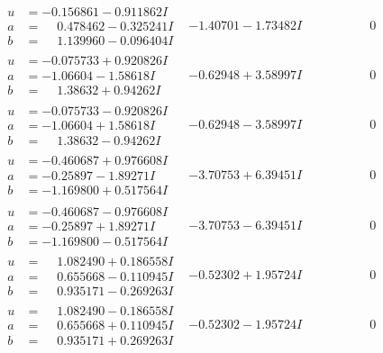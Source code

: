 \documentclass[1p]{elsarticle_modified}
\theoremstyle{definition}
\begin{document}
$$\begin{array}{c|c|c}
\begin{aligned}
u &= -0.156861 - 0.911862 I \\
a &= \phantom{-}0.478462 - 0.325241 I \\
b &= \phantom{-}1.139960 - 0.096404 I\end{aligned}
 & -1.40701 - 1.73482 I & \phantom{-0.000000 } 0 \\ \hline\begin{aligned}
u &= -0.075733 + 0.920826 I \\
a &= -1.06604 - 1.58618 I \\
b &= \phantom{-}1.38632 + 0.94262 I\end{aligned}
 & -0.62948 + 3.58997 I & \phantom{-0.000000 } 0 \\ \hline\begin{aligned}
u &= -0.075733 - 0.920826 I \\
a &= -1.06604 + 1.58618 I \\
b &= \phantom{-}1.38632 - 0.94262 I\end{aligned}
 & -0.62948 - 3.58997 I & \phantom{-0.000000 } 0 \\ \hline\begin{aligned}
u &= -0.460687 + 0.976608 I \\
a &= -0.25897 - 1.89271 I \\
b &= -1.169800 + 0.517564 I\end{aligned}
 & -3.70753 + 6.39451 I & \phantom{-0.000000 } 0 \\ \hline\begin{aligned}
u &= -0.460687 - 0.976608 I \\
a &= -0.25897 + 1.89271 I \\
b &= -1.169800 - 0.517564 I\end{aligned}
 & -3.70753 - 6.39451 I & \phantom{-0.000000 } 0 \\ \hline\begin{aligned}
u &= \phantom{-}1.082490 + 0.186558 I \\
a &= \phantom{-}0.655668 - 0.110945 I \\
b &= \phantom{-}0.935171 - 0.269263 I\end{aligned}
 & -0.52302 + 1.95724 I & \phantom{-0.000000 } 0 \\ \hline\begin{aligned}
u &= \phantom{-}1.082490 - 0.186558 I \\
a &= \phantom{-}0.655668 + 0.110945 I \\
b &= \phantom{-}0.935171 + 0.269263 I\end{aligned}
 & -0.52302 - 1.95724 I & \phantom{-0.000000 } 0 \\ \hline\begin{aligned}

\end{aligned}
\end{array}$$
\end{document}
